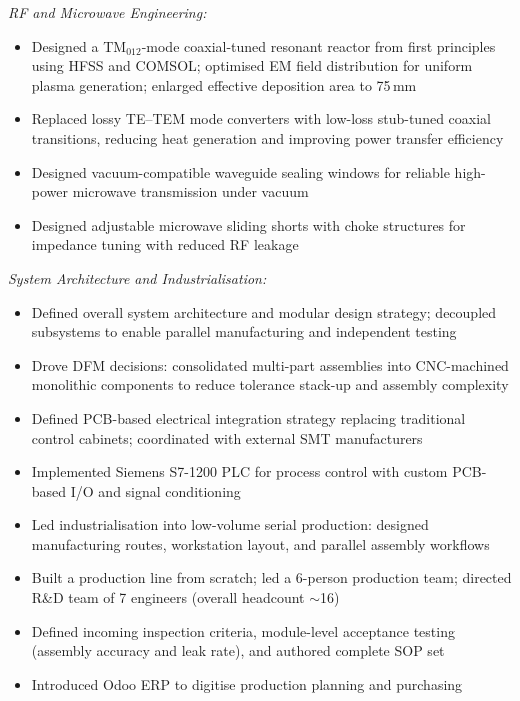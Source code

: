 \documentclass[a4paper,11pt]{article}
\begin{document}
\medskip
\noindent\textit{RF and Microwave Engineering:}
\begin{itemize}[noitemsep, topsep=2pt, leftmargin=*]
    \item Designed a TM$_{012}$-mode coaxial-tuned resonant reactor from first
          principles using HFSS and COMSOL; optimised EM field distribution for
          uniform plasma generation; enlarged effective deposition area to 75\,mm
    \item Replaced lossy TE--TEM mode converters with low-loss stub-tuned coaxial
          transitions, reducing heat generation and improving power transfer efficiency
    \item Designed vacuum-compatible waveguide sealing windows for reliable
          high-power microwave transmission under vacuum
    \item Designed adjustable microwave sliding shorts with choke structures for
          impedance tuning with reduced RF leakage
\end{itemize}

\medskip
\noindent\textit{System Architecture and Industrialisation:}
\begin{itemize}[noitemsep, topsep=2pt, leftmargin=*]
    \item Defined overall system architecture and modular design strategy;
          decoupled subsystems to enable parallel manufacturing and independent testing
    \item Drove DFM decisions: consolidated multi-part assemblies into CNC-machined
          monolithic components to reduce tolerance stack-up and assembly complexity
    \item Defined PCB-based electrical integration strategy replacing traditional
          control cabinets; coordinated with external SMT manufacturers
    \item Implemented Siemens S7-1200 PLC for process control with custom PCB-based
          I/O and signal conditioning
    \item Led industrialisation into low-volume serial production: designed
          manufacturing routes, workstation layout, and parallel assembly workflows
    \item Built a production line from scratch; led a 6-person production team;
          directed R\&D team of 7 engineers (overall headcount $\sim$16)
    \item Defined incoming inspection criteria, module-level acceptance testing
          (assembly accuracy and leak rate), and authored complete SOP set
    \item Introduced Odoo ERP to digitise production planning and purchasing
\end{itemize}
\end{document}
